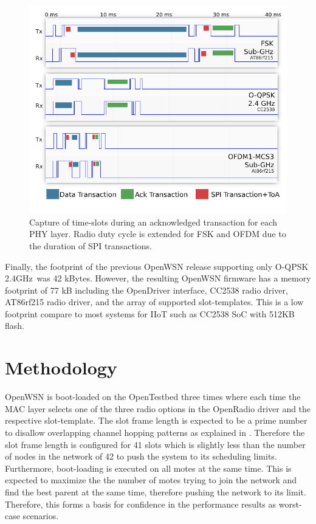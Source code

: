 \documentclass[journal]{IEEEtran}
\newcommand{\oqpsk}        {O-QPSK 2.4GHz}
\begin{document}
\begin{figure}
	\centering
	\includegraphics[width=0.90\columnwidth]{openradio}
	\caption{Capture of time-slots during an acknowledged transaction for each PHY layer. Radio duty cycle is extended for FSK and OFDM due to the duration of SPI transactions.}
    \label{fig:openradio}
\end{figure}


Finally, the footprint of the previous OpenWSN release supporting only \oqpsk\ was 42 kBytes.   
However, the resulting OpenWSN firmware has a memory footprint of 77 kB including the OpenDriver interface, CC2538 radio driver, AT86rf215 radio driver, and the array of supported slot-templates.
This is a low footprint compare to most systems for IIoT such as CC2538 SoC with 512KB flash. 

\section{Methodology}
\label{sec:methodology}


OpenWSN is boot-loaded on the OpenTestbed three times where each time the MAC layer selects one of the three radio options in the OpenRadio driver and the respective slot-template. 
The slot frame length is expected to be a prime number to disallow overlapping channel hopping patterns as explained in  \cite{t.watteyne15using}.
Therefore the slot frame length is configured for 41 slots which is slightly less than the number of nodes in the network of 42 to push the system to its scheduling limits. 
Furthermore, boot-loading is executed on all motes at the same time.
This is expected to maximize the the number of motes trying to join the network and find the best parent at the same time, therefore pushing the network to its limit.
Therefore, this forms a basis for confidence in the performance results as worst-case scenarios.
\end{document}
